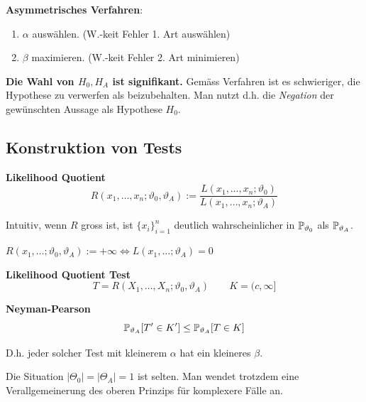 \method \textbf{Asymmetrisches Verfahren}:
\begin{enumerate}
    \item $\alpha$ auswählen. (W.-keit Fehler 1. Art auswählen)
    \item $\beta$ maximieren. (W.-keit Fehler 2. Art minimieren)
\end{enumerate}

{\footnotesize
    \remark \textbf{Die Wahl von $H_0,H_A$ ist signifikant.} Gemäss Verfahren ist es schwieriger, die Hypothese zu verwerfen als beizubehalten. Man nutzt d.h. die \textit{Negation} der gewünschten Aussage als Hypothese $H_0$.
}

\newpage

\subsection{Konstruktion von Tests}


 \textbf{Likelihood Quotient}\\
$$
    R(x_1,\ldots,x_n;\vartheta_0,\vartheta_A) := \frac{L(x_1,\ldots,x_n;\vartheta_0)}{L(x_1,\ldots,x_n;\vartheta_A)}
$$

Intuitiv, wenn $R$ gross ist, ist $\{x_i\}_{i=1}^n$ deutlich wahrscheinlicher in $\P_{\vartheta_0}$ als $\P_{\vartheta_A}$.

{\footnotesize
    \remark $R(x_1,\ldots;\vartheta_0,\vartheta_A) := +\infty \iff L(x_1,\ldots;\vartheta_A)=0$
}

 \textbf{Likelihood Quotient Test} 
$$
    T=R(X_1,\ldots,X_n;\vartheta_0,\vartheta_A) \qquad K = (c,\infty]
$$

\lemma \textbf{Neyman-Pearson}\\
$$
    \P_{\vartheta_A}[T'\in K'] \leq \P_{\vartheta_A}[T\in K]
$$

D.h. jeder solcher Test mit kleinerem $\alpha$ hat ein kleineres $\beta$.

{\footnotesize
    \remark Die Situation $|\Theta_0|=|\Theta_A| = 1$ ist selten. Man wendet trotzdem eine Verallgemeinerung des oberen Prinzips für komplexere Fälle an.
}

